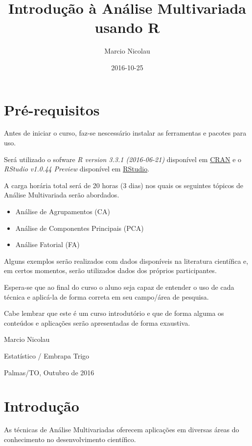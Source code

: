 \documentclass[]{book}
\title{Introdução à Análise Multivariada usando R}
\author{Marcio Nicolau}
\date{2016-10-25}
\providecommand{\tightlist}{%
  \setlength{\itemsep}{0pt}\setlength{\parskip}{0pt}}
\begin{document}
\maketitle

{
\setcounter{tocdepth}{1}
\tableofcontents
}
\chapter{Pré-requisitos}\label{pre-requisitos}

Antes de iniciar o curso, faz-se nescessário instalar as ferramentas e
pacotes para uso.

Será utilizado o sofware \emph{R version 3.3.1 (2016-06-21)} disponível
em \href{https://cran.r-project.org}{CRAN} e o \emph{RStudio v1.0.44
Preview} disponível em
\href{https://www.rstudio.com/products/rstudio/download/preview/}{RStudio}.

A carga horária total será de 20 horas (3 dias) nos quais os seguintes
tópicos de Análise Multivariada serão abordados.

\begin{itemize}
\tightlist
\item
  Análise de Agrupamentos (CA)
\item
  Análise de Componentes Principais (PCA)
\item
  Análise Fatorial (FA)
\end{itemize}

Alguns exemplos serão realizados com dados disponíveis na literatura
científica e, em certos momentos, serão utilizados dados dos próprios
participantes.

Espera-se que ao final do curso o aluno seja capaz de entender o uso de
cada técnica e aplicá-la de forma correta em seu campo/área de pesquisa.

Cabe lembrar que este é um curso introdutório e que de forma alguma os
conteúdos e aplicações serão apresentadas de forma exaustiva.

Marcio Nicolau

Estatístico / Embrapa Trigo

Palmas/TO, Outubro de 2016

\chapter{Introdução}\label{intro}

As técnicas de Análise Multivariadas oferecem aplicações em diversas
áreas do conhecimento no desenvolvimento científico.
\end{document}

